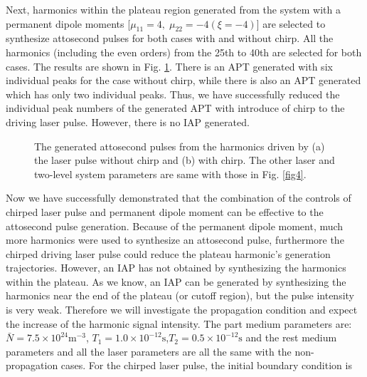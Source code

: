 \documentclass[10pt,letterpaper]{article}
\begin{document}
Next, harmonics within the plateau region generated from the system with a permanent dipole moments [$\mu_{11}=4,\;\mu_{22}=-4(\xi=-4)$]  are selected to synthesize attosecond pulses for both cases with and without chirp. All the harmonics (including the even orders) from the 25th to 40th are selected for both cases. The results are shown in Fig. \ref{fig5}. There is an APT generated with six individual peaks for the case without chirp, while there is also an APT generated which has only two individual peaks. Thus, we have successfully reduced the individual peak numbers of the generated APT with introduce of chirp to the driving laser pulse. However, there is no IAP generated.  
\begin{figure}[!htbp]
	\centering
	\caption{The generated attosecond pulses from the harmonics driven by (a) the laser pulse without chirp and (b) with chirp. The other laser and two-level system parameters are same with those in Fig. \ref{fig4}.}
	\label{fig5}
\end{figure}	

Now we have successfully demonstrated that the combination of the controls of chirped laser pulse and permanent dipole moment can be effective to the attosecond pulse generation. Because of the permanent dipole moment, much more harmonics were used to synthesize an attosecond pulse, furthermore the chirped driving laser pulse could reduce the plateau harmonic's generation trajectories. However, an IAP has not obtained by synthesizing the harmonics within the plateau. As we know, an IAP can be generated by synthesizing the harmonics near the end of the plateau (or cutoff region), but the pulse intensity is very weak. Therefore we will investigate the propagation condition and expect the increase of the harmonic signal intensity. The part medium parameters are: $ \bar{N}=7.5\times10^{24} \textrm{m}^{-3}$, $ T_{1}=1.0\times10^{-12} \textrm{s} $,$ T_{2}=0.5\times10^{-12} \textrm{s} $ \cite{Kalosha-Two-Level-PRL-1999} and the rest medium parameters and all the laser parameters are all the same with the non-propagation cases. For the chirped laser pulse, the initial boundary condition is
\end{document}
